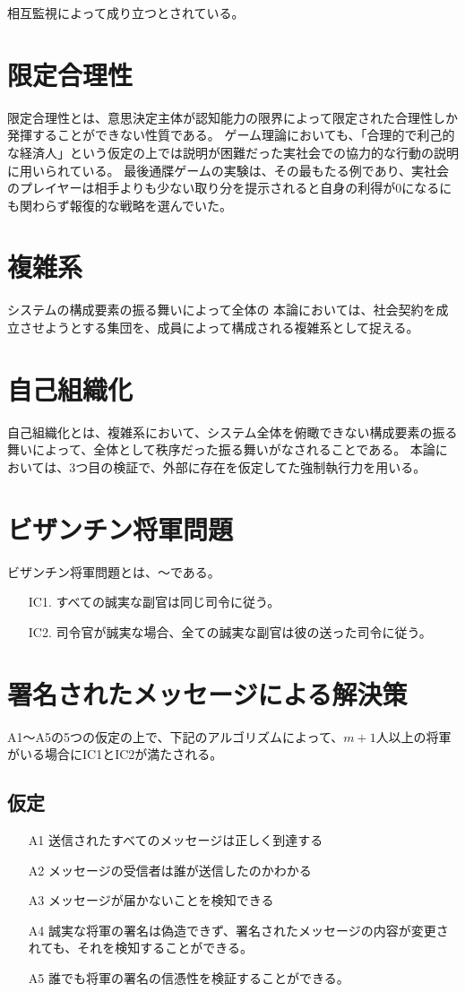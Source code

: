 相互監視によって成り立つとされている。


\section{限定合理性}
限定合理性とは、意思決定主体が認知能力の限界によって限定された合理性しか発揮することができない性質である。
ゲーム理論においても、「合理的で利己的な経済人」という仮定の上では説明が困難だった実社会での協力的な行動の説明に用いられている。
最後通牒ゲームの実験は、その最もたる例であり、実社会のプレイヤーは相手よりも少ない取り分を提示されると自身の利得が0になるにも関わらず報復的な戦略を選んでいた。\cite{GUTH1982367}

\section{複雑系}
システムの構成要素の振る舞いによって全体の
本論においては、社会契約を成立させようとする集団を、成員によって構成される複雑系として捉える。

\section{自己組織化}
自己組織化とは、複雑系において、システム全体を俯瞰できない構成要素の振る舞いによって、全体として秩序だった振る舞いがなされることである。
本論においては、3つ目の検証で、外部に存在を仮定してた強制執行力を用いる。

\section{ビザンチン将軍問題}
ビザンチン将軍問題とは、〜である。\cite{lamport1982}

\begin{itemize}
  \item[IC1.] すべての誠実な副官は同じ司令に従う。
  \item[IC2.] 司令官が誠実な場合、全ての誠実な副官は彼の送った司令に従う。
\end{itemize}

\section{署名されたメッセージによる解決策}
A1〜A5の5つの仮定の上で、下記のアルゴリズムによって、$m+1$人以上の将軍がいる場合にIC1とIC2が満たされる。

\subsection{仮定}
\begin{itemize}
  \item[A1] 送信されたすべてのメッセージは正しく到達する
  \item[A2] メッセージの受信者は誰が送信したのかわかる
  \item[A3] メッセージが届かないことを検知できる
  \item[A4] 誠実な将軍の署名は偽造できず、署名されたメッセージの内容が変更されても、それを検知することができる。
  \item[A5] 誰でも将軍の署名の信憑性を検証することができる。
\end{itemize}

